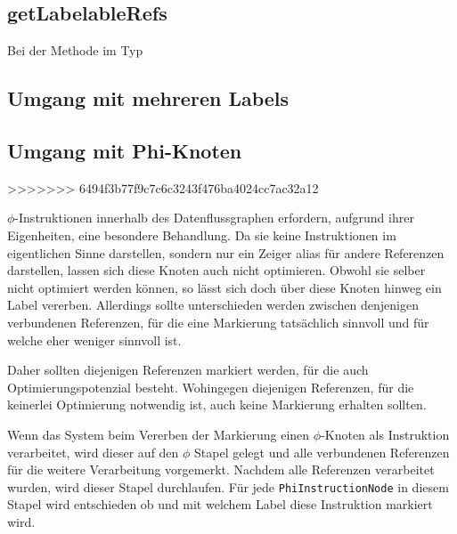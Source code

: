 \subsection{getLabelableRefs}\label{ssec:labelRefs}

Bei der Methode im Typ 

\subsection{Umgang mit mehreren Labels}

\subsection{Umgang mit Phi-Knoten}\label{ssec:phis}
>>>>>>> 6494f3b77f9c7c6c3243f476ba4024cc7ac32a12

$\phi$-Instruktionen innerhalb des Datenflussgraphen erfordern, aufgrund ihrer Eigenheiten,
eine besondere Behandlung. Da sie keine Instruktionen im eigentlichen Sinne darstellen, sondern
nur ein Zeiger alias für andere Referenzen darstellen, lassen sich diese Knoten auch nicht
optimieren. Obwohl sie selber nicht optimiert werden können, so lässt sich doch über diese 
Knoten hinweg ein Label vererben. Allerdings sollte unterschieden werden zwischen denjenigen
verbundenen Referenzen, für die eine Markierung tatsächlich sinnvoll und für welche eher
weniger sinnvoll ist. 

Daher sollten diejenigen Referenzen markiert werden, für die auch Optimierungspotenzial 
besteht. Wohingegen diejenigen Referenzen, für die keinerlei Optimierung notwendig 
ist, auch keine Markierung erhalten sollten. 

Wenn das System beim Vererben der Markierung einen $\phi$-Knoten als Instruktion verarbeitet,
wird dieser auf den $\phi$ Stapel gelegt und alle verbundenen Referenzen für die
weitere Verarbeitung vorgemerkt. Nachdem alle Referenzen verarbeitet wurden, wird dieser
Stapel durchlaufen. Für jede \texttt{PhiInstructionNode} in diesem Stapel wird entschieden
ob und mit welchem Label diese Instruktion markiert wird. 